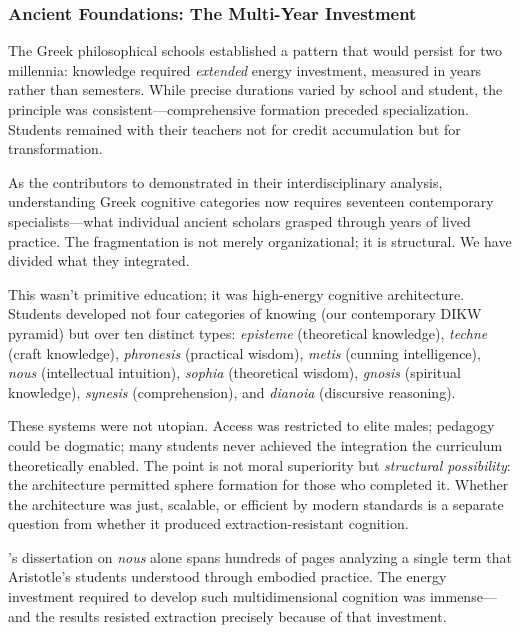 \subsubsection{Ancient Foundations: The Multi-Year Investment}

The Greek philosophical schools established a pattern that would persist for two millennia: knowledge required \textit{extended} energy investment, measured in years rather than semesters. While precise durations varied by school and student, the principle was consistent---comprehensive formation preceded specialization. Students remained with their teachers not for credit accumulation but for transformation.

As the contributors to \citet{mouzala2024} demonstrated in their interdisciplinary analysis, understanding Greek cognitive categories now requires seventeen contemporary specialists---what individual ancient scholars grasped through years of lived practice. The fragmentation is not merely organizational; it is structural. We have divided what they integrated.

This wasn't primitive education; it was high-energy cognitive architecture. Students developed not four categories of knowing (our contemporary DIKW pyramid) but over ten distinct types: \textit{episteme} (theoretical knowledge), \textit{techne} (craft knowledge), \textit{phronesis} (practical wisdom), \textit{metis} (cunning intelligence), \textit{nous} (intellectual intuition), \textit{sophia} (theoretical wisdom), \textit{gnosis} (spiritual knowledge), \textit{synesis} (comprehension), and \textit{dianoia} (discursive reasoning).

These systems were not utopian. Access was restricted to elite males; pedagogy could be dogmatic; many students never achieved the integration the curriculum theoretically enabled. The point is not moral superiority but \textit{structural possibility}: the architecture permitted sphere formation for those who completed it. Whether the architecture was just, scalable, or efficient by modern standards is a separate question from whether it produced extraction-resistant cognition.

\citeauthor{erkizan1997}'s \citeyearpar{erkizan1997} dissertation on \textit{nous} alone spans hundreds of pages analyzing a single term that Aristotle's students understood through embodied practice. The energy investment required to develop such multidimensional cognition was immense---and the results resisted extraction precisely because of that investment.

